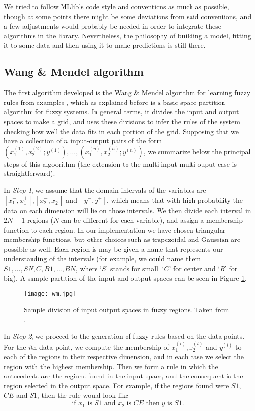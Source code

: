 We tried to follow MLlib's code style and conventions as much as possible, though at some points there might be some deviations from said conventions, and a few adjustments would probably be needed in order to integrate these algorithms in the library. Nevertheless, the philosophy of building a model, fitting it to some data and then using it to make predictions is still there.

\subsection{Wang \& Mendel algorithm}

The first algorithm developed is the Wang \& Mendel algorithm for learning fuzzy rules from examples \cite{wang1992generating}, which as explained before is a basic space partition algorithm for fuzzy systems. In general terms, it divides the input and output spaces to make a grid, and uses these divisions to infer the rules of the system checking how well the data fits in each portion of the grid. Supposing that we have a collection of $n$ input-output pairs of the form $(x_1^{(1)}, x_2^{(2)}; y^{(1)}),\dots, (x_1^{(n)}, x_2^{(n)}; y^{(n)})$, we summarize below the principal steps of this algoorithm (the extension to the multi-input multi-ouput case is straightforward).

In \textit{Step 1}, we assume that the domain intervals of the variables are $[x_1^-,x_1^+], [x_2^-,x_2^+]$ and $[y^-,y^+]$, which means that with high probability the data on each dimension will lie on those intervals. We then divide each interval in $2N+1$ regions ($N$ can be different for each variable), and assign a membership function to each region. In our implementation we have chosen triangular membership functions, but other choices such as trapezoidal and Gaussian are possible as well. Each region is may be given a name that represents our understanding of the intervals (for example, we could name them $S1,\dots, SN, C, B1, \dots, BN$, where `$S$' stands for small, `$C$' for center and `$B$' for big). A sample partition of the input and output spaces can be seen in Figure \ref{fig:wm}.

\begin{figure}[h!]
\centering
\texttt{[image: wm.jpg]}
\caption{Sample division of input output spaces in fuzzy regions. Taken from \cite{wang1992generating}.}
\label{fig:wm}
\end{figure}

In \textit{Step 2}, we proceed to the generation of fuzzy rules based on the data points. For the $i$th data point, we compute the membership of $x_1^{(i)},x_2^{(i)}$ and $y^{(i)}$ to each of the regions in their respective dimension, and in each case we select the region with the highest membership. Then we form a rule in which the antecedents are the regions found in the input space, and the consequent is the region selected in the output space. For example, if the regions found were $S1$, $CE$ and $S1$, then the rule would look like
\begin{equation}\label{eq:rule}
  \text{if $x_1$ is $S1$ and $x_2$ is $CE$ then $y$ is $S1$}.
\end{equation}

